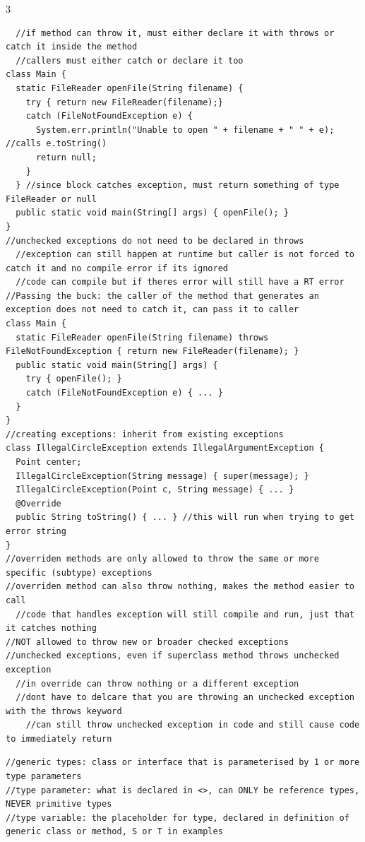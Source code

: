 \documentclass[10pt]{article}
\begin{document}
\begin{multicols*}{3}
\begin{verbatim}
  //if method can throw it, must either declare it with throws or catch it inside the method
  //callers must either catch or declare it too
class Main {
  static FileReader openFile(String filename) {
    try { return new FileReader(filename);} 
    catch (FileNotFoundException e) {
      System.err.println("Unable to open " + filename + " " + e); //calls e.toString()
      return null;
    }
  } //since block catches exception, must return something of type FileReader or null
  public static void main(String[] args) { openFile(); }
}
//unchecked exceptions do not need to be declared in throws
  //exception can still happen at runtime but caller is not forced to catch it and no compile error if its ignored
  //code can compile but if theres error will still have a RT error
//Passing the buck: the caller of the method that generates an exception does not need to catch it, can pass it to caller
class Main {
  static FileReader openFile(String filename) throws FileNotFoundException { return new FileReader(filename); }
  public static void main(String[] args) {
    try { openFile(); } 
    catch (FileNotFoundException e) { ... }
  }
}
//creating exceptions: inherit from existing exceptions
class IllegalCircleException extends IllegalArgumentException {
  Point center;
  IllegalCircleException(String message) { super(message); }
  IllegalCircleException(Point c, String message) { ... }
  @Override
  public String toString() { ... } //this will run when trying to get error string
}
//overriden methods are only allowed to throw the same or more specific (subtype) exceptions
//overriden method can also throw nothing, makes the method easier to call
  //code that handles exception will still compile and run, just that it catches nothing
//NOT allowed to throw new or broader checked exceptions
//unchecked exceptions, even if superclass method throws unchecked exception
  //in override can throw nothing or a different exception
  //dont have to delcare that you are throwing an unchecked exception with the throws keyword
    //can still throw unchecked exception in code and still cause code to immediately return
\end{verbatim}
\begin{verbatim}
//generic types: class or interface that is parameterised by 1 or more type parameters
//type parameter: what is declared in <>, can ONLY be reference types, NEVER primitive types
//type variable: the placeholder for type, declared in definition of generic class or method, S or T in examples

\end{verbatim}
\end{multicols*}
\end{document}
